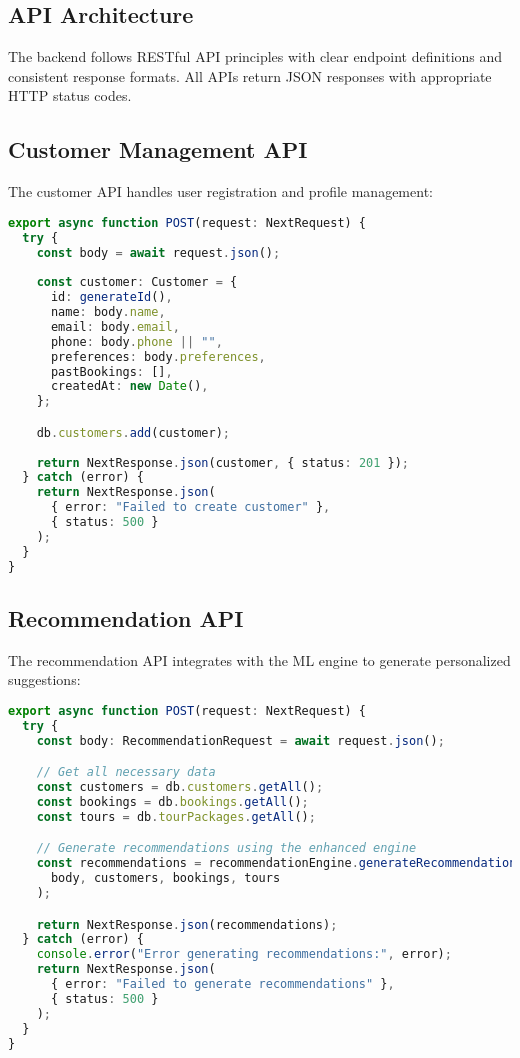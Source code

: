 \documentclass[12pt,a4paper]{article}
\begin{document}
\subsection{API Architecture}
The backend follows RESTful API principles with clear endpoint definitions and consistent response formats. All APIs return JSON responses with appropriate HTTP status codes.

\subsection{Customer Management API}
The customer API handles user registration and profile management:

\begin{lstlisting}[language=typescript, caption=Customer API Implementation]
export async function POST(request: NextRequest) {
  try {
    const body = await request.json();
    
    const customer: Customer = {
      id: generateId(),
      name: body.name,
      email: body.email,
      phone: body.phone || "",
      preferences: body.preferences,
      pastBookings: [],
      createdAt: new Date(),
    };

    db.customers.add(customer);
    
    return NextResponse.json(customer, { status: 201 });
  } catch (error) {
    return NextResponse.json(
      { error: "Failed to create customer" }, 
      { status: 500 }
    );
  }
}
\end{lstlisting}

\subsection{Recommendation API}
The recommendation API integrates with the ML engine to generate personalized suggestions:

\begin{lstlisting}[language=typescript, caption=Recommendation API Implementation]
export async function POST(request: NextRequest) {
  try {
    const body: RecommendationRequest = await request.json();

    // Get all necessary data
    const customers = db.customers.getAll();
    const bookings = db.bookings.getAll();
    const tours = db.tourPackages.getAll();

    // Generate recommendations using the enhanced engine
    const recommendations = recommendationEngine.generateRecommendations(
      body, customers, bookings, tours
    );

    return NextResponse.json(recommendations);
  } catch (error) {
    console.error("Error generating recommendations:", error);
    return NextResponse.json(
      { error: "Failed to generate recommendations" }, 
      { status: 500 }
    );
  }
}
\end{lstlisting}
\end{document}
